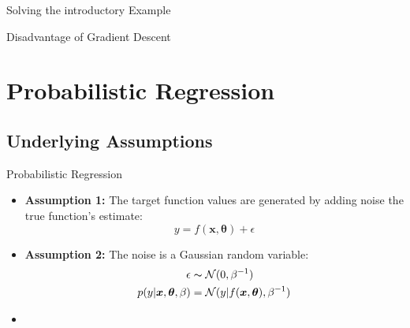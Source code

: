 \begin{frame}{Solving the introductory Example}{}
\end{frame}


\begin{frame}{Disadvantage of Gradient Descent}{}
	
\end{frame}


\section{Probabilistic Regression}

\subsection{Underlying Assumptions}

\begin{frame}{Probabilistic Regression}{}
	\begin{itemize}
		\item \textbf{Assumption 1:} The target function values are generated by adding noise the true function's estimate:
		\begin{equation}
			y = f(\bm{x}, \bm{\theta}) + \epsilon
		\end{equation}
		\item \textbf{Assumption 2:} The noise is a Gaussian random variable:
		\begin{align}
			\epsilon &\thicksim \mathcal{N}(0, \beta^{-1}) \\
			p(y \vert \bm{x}, \bm{\theta}, \beta) &= \mathcal{N}(y \vert f(\bm{x}, \bm{\theta}), \beta^{-1})
		\end{align}
		\item {}
	\end{itemize}
\end{frame}


